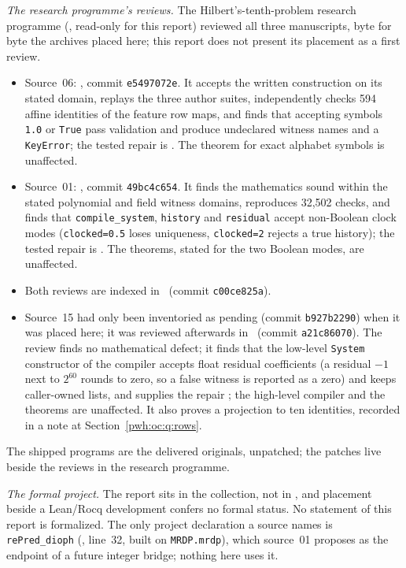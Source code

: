 \documentclass[11pt,letterpaper]{article}
\numberwithin{equation}{section}
\theoremstyle{definition}
\begin{document}
\emph{The research programme's reviews.} The Hilbert's-tenth-problem
research programme (, read-only for
this report) reviewed all three manuscripts, byte for byte the archives
placed here; this report does not present its placement as a first review.
\begin{itemize}
\item Source~06: \cite{reviewUH}, commit \texttt{e5497072e}. It accepts the
written construction on its stated domain, replays the three author suites,
independently checks 594 affine identities of the feature row maps, and
finds that accepting symbols \texttt{1.0} or \texttt{True} pass validation
and produce undeclared witness names and a \texttt{KeyError}; the tested
repair is . The
theorem for exact alphabet symbols is unaffected.
\item Source~01: \cite{reviewBS}, commit \texttt{49bc4c654}. It finds the
mathematics sound within the stated polynomial and field witness domains,
reproduces 32,502 checks, and finds that \texttt{compile\_system},
\texttt{history} and \texttt{residual} accept non-Boolean clock modes
(\texttt{clocked=0.5} loses uniqueness, \texttt{clocked=2} rejects a true
history); the tested repair is
. The theorems, stated for
the two Boolean modes, are unaffected.
\item Both reviews are indexed in~\cite{reviewIX} (commit \texttt{c00ce825a}).
\item Source~15 had only been inventoried as pending (commit
\texttt{b927b2290}) when it was placed here; it was reviewed afterwards
in~\cite{reviewOC} (commit \texttt{a21c86070}). The review finds no
mathematical defect; it finds that the low-level \texttt{System} constructor
of the compiler accepts float residual coefficients (a residual $-1$ next to
$2^{60}$ rounds to zero, so a false witness is reported as a zero) and keeps
caller-owned lists, and supplies the repair
; the high-level compiler
and the theorems are unaffected. It also proves a projection to ten
identities, recorded in a note at Section~\ref{pwh:oc:q:rows}.
\end{itemize}
The shipped programs are the delivered originals, unpatched; the patches
live beside the reviews in the research programme.

\emph{The formal project.} The report sits in the collection, not in
, and placement beside a Lean/Rocq
development confers no formal status. No statement of this report is
formalized. The only project declaration a source names is
\texttt{rePred\_dioph}
(,
line~32, built on \texttt{MRDP.mrdp}), which source~01 proposes as the
endpoint of a future integer bridge; nothing here uses it.
\end{document}
